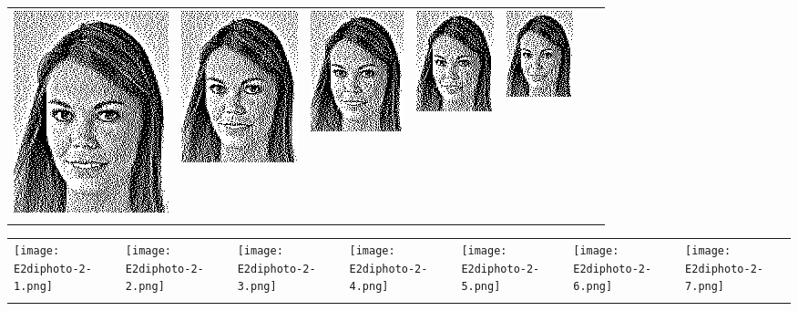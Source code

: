 \begin{tabular}{lllllll}
	\includegraphics{Ediphoto-2-3.png} &
	\includegraphics{Ediphoto-2-4.png} &
	\includegraphics{Ediphoto-2-5.png} &
	\includegraphics{Ediphoto-2-6.png} &
	\includegraphics{Ediphoto-2-7.png} \\
	 &
	 &
	 &
	 &
	 &
	 &
	 \\
\end{tabular}
\begin{tabular}{lllllll}
	\texttt{[image: E2diphoto-2-1.png]} &
	\texttt{[image: E2diphoto-2-2.png]} &
	\texttt{[image: E2diphoto-2-3.png]} &
	\texttt{[image: E2diphoto-2-4.png]} &
	\texttt{[image: E2diphoto-2-5.png]} &
	\texttt{[image: E2diphoto-2-6.png]} &
	\texttt{[image: E2diphoto-2-7.png]} \\
	 &
	 &
	 &
	 &
	 &
	 &
	 \\
\end{tabular}


